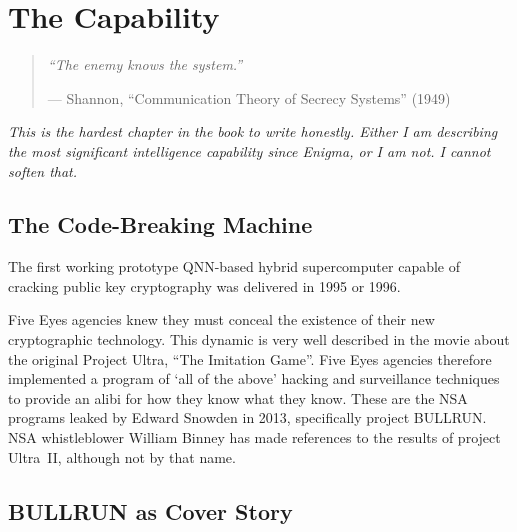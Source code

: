 
\chapter{The Capability}
\label{pos17:the-capability}

\begin{quote}\small\textit{%
``The enemy knows the system.''%
}\par\raggedleft --- Shannon, ``Communication Theory of Secrecy Systems'' (1949)\end{quote}

\vspace{0.5cm}



\noindent\textit{This is the hardest chapter in the book to write honestly. Either I am describing the most significant intelligence capability since Enigma, or I am not. I cannot soften that.}

\section*{The Code-Breaking Machine}
\label{pos17:the-code-breaking-machine}

The first working prototype QNN-based hybrid supercomputer capable of cracking public key cryptography was delivered in 1995 or 1996.

Five Eyes agencies knew they must conceal the existence of their new cryptographic technology. This dynamic is very well described in the movie about the original Project Ultra, ``The Imitation Game''. Five Eyes agencies therefore implemented a program of `all of the above' hacking and surveillance techniques to provide an alibi for how they know what they know. These are the NSA programs leaked by Edward Snowden in 2013, specifically project BULLRUN\@. NSA whistleblower William Binney has made references to the results of project Ultra~II, although not by that name.

\section*{BULLRUN as Cover Story}
\label{pos17:bullrun-as-cover-story}

